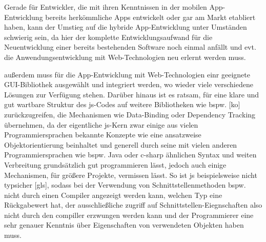 Gerade für Entwickler, die mit ihren Kenntnissen in der mobilen App-Entwicklung bereits herkömmliche Apps entwickelt oder gar am Markt etabliert haben, kann der Umstieg auf die hybride App-Entwicklung unter Umständen schwierig sein, da hier der komplette Entwicklungsaufwand für die Neuentwicklung einer bereits bestehenden Software noch einmal anfällt und evt. die Anwendungsentwicklung mit Web-Technologien neu erlernt werden muss.






außerdem muss für die App-Entwicklung mit Web-Technologien einr geeignete GUI-Bibliothek ausgewählt und integriert werden, wo wieder viele verschiedene Lösungen zur Verfügung stehen.
Darüber hinaus ist es ratsam, für eine klare und gut wartbare Struktur des \gls{js}-Codes auf weitere Bibliotheken wie bspw. [ko] zurückzugreifen, die Mechanismen wie Data-Binding oder Dependency Tracking übernehmen, da der eigentliche \gls{js}-Kern zwar einige aus vielen Programmiersprachen bekannte Konzepte wie eine ansatzweise Objektorientierung beinhaltet und generell durch seine mit vielen anderen Programmiersprachen wie bspw. Java oder \gls{c-sharp} ähnlichen Syntax und weiten Verbreitung grundsätzlich gut programmieren lässt, jedoch auch einige Mechanismen, \zB für größere Projekte, vermissen lässt.
So ist \gls{js} beispielsweise nicht typsicher [gls], sodass bei der Verwendung von Schnittstellenmethoden bspw. nicht durch einen Compiler angezeigt werden kann, welchen Typ eine Rückgabewert hat, der ausschließliche zugriff auf Schnittstellen-Eiegnschaften also nicht durch den compiller erzwungen werden kann und der Programmierer eine sehr genauer Kenntnis über Eigenschaften von verwendeten Objekten haben muss.

